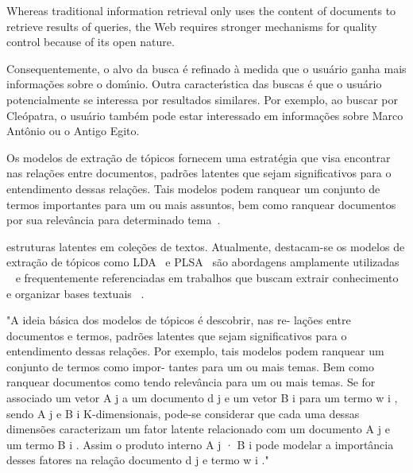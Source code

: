 






























Whereas traditional information retrieval only uses the content of documents to
retrieve results of queries, the Web requires stronger mechanisms for quality control because
of its open nature.



Consequentemente, o alvo da busca é refinado à medida que o usuário ganha mais informações sobre o domı́nio. Outra caracterı́stica das buscas é que o usuário potencialmente se interessa por resultados similares. Por exemplo, ao buscar por Cleópatra, o usuário também pode estar interessado em informações sobre Marco Antônio ou o Antigo Egito.




Os modelos de extração de tópicos fornecem uma estratégia que visa encontrar nas relações entre documentos, padrões latentes que sejam significativos para o entendimento dessas relações. Tais modelos podem ranquear um conjunto de termos importantes para um ou mais assuntos, bem como ranquear documentos por sua relevância para determinado tema~\cite{Faleiros}.


estruturas latentes em coleções de textos. Atualmente, destacam-se os modelos de extração de tópicos como LDA~\cite{Blei2003} e PLSA~\cite{Hofmann1999} são abordagens amplamente utilizadas ~\cite{DZhu20122} e frequentemente referenciadas em trabalhos que buscam extrair conhecimento e organizar bases textuais ~\cite{Steyvers2007, OCallaghan2015}. 

"A ideia básica dos modelos de tópicos é descobrir, nas re- lações entre documentos e termos, padrões latentes que sejam significativos para o entendimento dessas relações. Por exemplo, tais modelos podem ranquear um conjunto de termos como impor- tantes para um ou mais temas. Bem como ranquear documentos como tendo relevância para um ou mais temas. Se for associado um vetor A j a um documento d j e um vetor B i para um termo w i , sendo A j e B i K-dimensionais, pode-se considerar que cada uma dessas dimensões caracterizam um fator latente relacionado com um documento A j e um termo B i . Assim o produto interno A j · B i pode modelar a importância desses fatores na relação documento d j e termo w i ."




